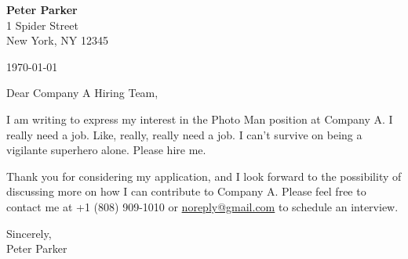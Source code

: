 \documentclass[12pt,a4paper]{article}
\newcommand{\company}{Company A}
\newcommand{\position}{Photo Man}
\begin{document}
\begin{flushleft}
\textbf{Peter Parker}\\
1 Spider Street\\
New York, NY 12345\\
\end{flushleft}
\begin{flushright}
\today
\end{flushright}

\begin{flushleft}
    Dear \company{} Hiring Team,
\end{flushleft}

\vspace{0.5em}

\begin{flushleft}

I am writing to express my interest in the \position{} position at \company. I really need a job. Like, really, really need a job. I can't survive on being a vigilante superhero alone. Please hire me.
\vspace{1em}

Thank you for considering my application, and I look forward to the possibility of discussing more on how I can contribute to \company. 
Please feel free to contact me at +1 (808) 909-1010 or 
\href{mailto://noreply@gmail.com}{noreply@gmail.com} to schedule an interview.
\end{flushleft}

\vspace{1em}
\begin{flushleft}
Sincerely, \\[3em]
Peter Parker
\end{flushleft}
\end{document}

